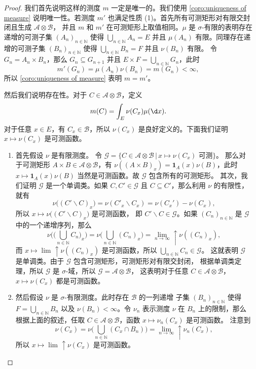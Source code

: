 \documentclass[fontset=none]{Notes}
\newcommand{\ulim}[1][]{\lim_{#1}\mathrel{\uparrow}}
\newcommand{\indicator}[1]{\mathbold 1_{#1}}
\begin{document}
\begin{proof}
  我们首先说明这样的测度 $m$ 一定是唯一的。我们使用 \autoref{coro:uniqueness of measure}
  说明唯一性。若测度 $m'$ 也满足性质 (1)。首先所有可测矩形对有限交封闭且生成 $\mathcal{A}\otimes \mathcal{B}$，
  并且 $m$ 和 $m'$ 在可测矩形上取值相同。$\mu$ 是 $\sigma$-有限的表明存在
  递增的可测子集 $(A_n)_{n\in \mathbb{N}}$ 使得 $\bigcup_{n\in \mathbb{N}}A_n=E$
  并且 $\mu(A_n)$ 有限。同理存在递增的可测子集 $(B_n)_{n\in \mathbb{N}}$ 
  使得 $\bigcup_{n\in \mathbb{N}}B_n=F$ 并且 $\nu(B_n)$ 有限。
  令 $G_n=A_n\times B_n$，那么 $G_n\subseteq G_{n+1}$ 并且
  $E\times F=\bigcup_{n\in \mathbb{N}}G_n$，此时
  \[
    m'(G_n)=\mu(A_n)\nu(B_n)=m(G_n)<\infty,  
  \] 
  所以 \autoref{coro:uniqueness of measure} 表明 $m=m'$。

  然后我们说明存在性。对于 $C\in \mathcal{A}\otimes \mathcal{B}$，定义
  \begin{equation}\label{eq:def of product measure}
    m(C) =\int_E\nu(C_x)\mu(\d x).
  \end{equation}
  对于任意 $x\in E$，有 $C_x\in \mathcal{B}$，所以 $\nu(C_x)$
  是良好定义的。下面我们证明 $x\mapsto \nu(C_x)$ 是可测函数。
  \begin{enumerate}[label=(\arabic*)]
    \item 首先假设 $\nu$ 是有限测度。
    令 $\mathcal{G}=\{C\in \mathcal{A}\otimes \mathcal{B}\,|\, \text{$x\mapsto \nu(C_x)$ 可测}\}$。
    那么对于可测矩形 $A\times B\in \mathcal{A}\otimes \mathcal{B}$，有
    $\nu((A\times B)_x)=\indicator{A}(x)\nu(B)$，此时 $x\mapsto \indicator{A}(x)\nu(B)$
    当然是可测函数。故 $\mathcal{G}$ 包含所有的可测矩形。
    其次，我们证明 $\mathcal{G}$ 是一个单调类。如果 $C,C'\in \mathcal{G}$
    且 $C\subseteq  C'$，那么利用 $\nu$ 的有限性，就有
    \[
      \nu\bigl((C'\smallsetminus C)_x\bigr)  
      =\nu(C'_x \smallsetminus C_x)=\nu(C_x')-\nu(C_x),
    \]
    所以 $x\mapsto \nu\bigl((C'\smallsetminus C)_x\bigr)$ 是可测函数，
    即 $C' \smallsetminus C\in \mathcal{G}$。如果 $(C_n)_{n\in \mathbb{N}}$
    是 $\mathcal{G}$ 中的一个递增序列，那么
    \[
      \nu\biggl(\biggl(\bigcup_{n\in \mathbb{N}}C_n\biggr)_x\biggr)  
      =\nu\biggl(\bigcup_{n\in \mathbb{N}}(C_n)_x\biggr)
      =\ulim[n\to\infty]\nu((C_n)_x),
    \] 
    而 $x\mapsto \ulim \nu((C_n)_x)$ 是可测函数，所以 $\bigcup_{n\in \mathbb{N}}C_n\in \mathcal{G}$。
    这就表明 $\mathcal{G}$ 是单调类。由于 $\mathcal{G}$ 包含可测矩形，可测矩形对有限交封闭，
    根据单调类定理，所以 $\mathcal{G}$ 是 $\sigma$-域，所以 $\mathcal{G}=\mathcal{A}\otimes \mathcal{B}$，
    这表明对于任意 $C\in \mathcal{A}\otimes \mathcal{B}$，$x\mapsto \nu(C_x)$ 都是可测函数。
    \item 然后假设 $\nu$ 是 $\sigma$-有限测度。此时存在 $\mathcal{B}$ 的一列递增
    子集 $(B_n)_{n\in \mathbb{N}}$ 使得 $F=\bigcup_{n\in \mathbb{N}}B_n$
    以及 $\nu(B_n)<\infty$。令 $\nu_n$ 表示测度 $\nu$ 在 $B_n$ 上的限制，那么
    根据上面的叙述，任取 $C\in \mathcal{A}\otimes \mathcal{B}$，函数 $x\mapsto \nu_n(C_x)$ 是可测函数。
    注意到
    \[
      \nu(C_x)=\nu\biggl(\bigcup_{n\in \mathbb{N}}(C_x\cap B_n)\biggr)  
      =\ulim[n\to\infty] \nu_n(C_x),
    \]
    所以 $x\mapsto \ulim \nu(C_x)$ 是可测函数。
  \end{enumerate}


\end{proof}
\end{document}
